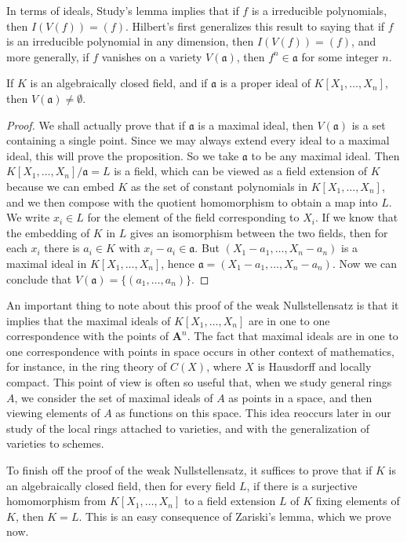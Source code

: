 In terms of ideals, Study's lemma implies that if $f$ is a irreducible polynomials, then $I(V(f)) = (f)$. Hilbert's first generalizes this result to saying that if $f$ is an irreducible polynomial in any dimension, then $I(V(f)) = (f)$, and more generally, if $f$ vanishes on a variety $V(\mathfrak{a})$, then $f^n \in \mathfrak{a}$ for some integer $n$.

\begin{lemma}
    If $K$ is an algebraically closed field, and if $\mathfrak{a}$ is a proper ideal of $K[X_1, \dots, X_n]$, then $V(\mathfrak{a}) \neq \emptyset$.
\end{lemma}
\begin{proof}
    We shall actually prove that if $\mathfrak{a}$ is a maximal ideal, then $V(\mathfrak{a})$ is a set containing a single point. Since we may always extend every ideal to a maximal ideal, this will prove the proposition. So we take $\mathfrak{a}$ to be any maximal ideal. Then $K[X_1, \dots, X_n]/\mathfrak{a} = L$ is a field, which can be viewed as a field extension of $K$ because we can embed $K$ as the set of constant polynomials in $K[X_1, \dots, X_n]$, and we then compose with the quotient homomorphism to obtain a map into $L$. We write $x_i \in L$ for the element of the field corresponding to $X_i$. If we know that the embedding of $K$ in $L$ gives an isomorphism between the two fields, then for each $x_i$ there is $a_i \in K$ with $x_i - a_i \in \mathfrak{a}$. But $(X_1 - a_1, \dots, X_n - a_n)$ is a maximal ideal in $K[X_1, \dots, X_n]$, hence $\mathfrak{a} = (X_1 - a_1, \dots, X_n - a_n)$. Now we can conclude that $V(\mathfrak{a}) = \{ (a_1, \dots, a_n) \}$.
\end{proof}

An important thing to note about this proof of the weak Nullstellensatz is that it implies that the maximal ideals of $K[X_1, \dots, X_n]$ are in one to one correspondence with the points of $\mathbf{A}^n$. The fact that maximal ideals are in one to one correspondence with points in space occurs in other context of mathematics, for instance, in the ring theory of $C(X)$, where $X$ is Hausdorff and locally compact. This point of view is often so useful that, when we study general rings $A$, we consider the set of maximal ideals of $A$ as points in a space, and then viewing elements of $A$ as functions on this space. This idea reoccurs later in our study of the local rings attached to varieties, and with the generalization of varieties to schemes.

To finish off the proof of the weak Nullstellensatz, it suffices to prove that if $K$ is an algebraically closed field, then for every field $L$, if there is a surjective homomorphism from $K[X_1, \dots, X_n]$ to a field extension $L$ of $K$ fixing elements of $K$, then $K = L$. This is an easy consequence of Zariski's lemma, which we prove now.

